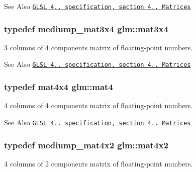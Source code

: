 \begin{DoxySeeAlso}{See Also}
\href{http://www.opengl.org/registry/doc/GLSLangSpec.4.20.8.pdf}{\tt G\-L\-S\-L 4.. specification, section 4.. Matrices} 
\end{DoxySeeAlso}
\hypertarget{group__core__types_ga75499a515649f0db9593beb23ab084a5}{
\subsubsection[{mat3x4}]{\setlength{\rightskip}{0pt plus 5cm}typedef mediump\-\_\-mat3x4 {\bf glm\-::mat3x4}}}\label{group__core__types_ga75499a515649f0db9593beb23ab084a5}


3 columns of 4 components matrix of floating-\/point numbers. 

\begin{DoxySeeAlso}{See Also}
\href{http://www.opengl.org/registry/doc/GLSLangSpec.4.20.8.pdf}{\tt G\-L\-S\-L 4.. specification, section 4.. Matrices} 
\end{DoxySeeAlso}
\hypertarget{group__core__types_ga7dcd2365c2e368e6af5b7adeb6a9c8df}{
\subsubsection[{mat4}]{\setlength{\rightskip}{0pt plus 5cm}typedef mat4x4 {\bf glm\-::mat4}}}\label{group__core__types_ga7dcd2365c2e368e6af5b7adeb6a9c8df}


4 columns of 4 components matrix of floating-\/point numbers. 

\begin{DoxySeeAlso}{See Also}
\href{http://www.opengl.org/registry/doc/GLSLangSpec.4.20.8.pdf}{\tt G\-L\-S\-L 4.. specification, section 4.. Matrices} 
\end{DoxySeeAlso}
\hypertarget{group__core__types_gaf8b375fbef797b3730fcddc7bd60b59f}{
\subsubsection[{mat4x2}]{\setlength{\rightskip}{0pt plus 5cm}typedef mediump\-\_\-mat4x2 {\bf glm\-::mat4x2}}}\label{group__core__types_gaf8b375fbef797b3730fcddc7bd60b59f}


4 columns of 2 components matrix of floating-\/point numbers. 

